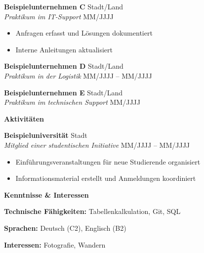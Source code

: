 \documentclass[11pt]{article}
\begin{document}
\vspace{12pt}
\textbf{Beispielunternehmen C} \hfill Stadt/Land \\
\textit{Praktikum im IT-Support} \hfill MM/JJJJ
\begin{itemize}[noitemsep, topsep=0pt, parsep=0pt]
    \item Anfragen erfasst und Lösungen dokumentiert
    \item Interne Anleitungen aktualisiert
\end{itemize}

\vspace{12pt}
\textbf{Beispielunternehmen D} \hfill Stadt/Land \\
\textit{Praktikum in der Logistik} \hfill MM/JJJJ -- MM/JJJJ

\vspace{12pt}
\textbf{Beispielunternehmen E} \hfill Stadt/Land \\
\textit{Praktikum im technischen Support} \hfill MM/JJJJ

\vspace{12pt}

\begin{center}
    \textbf{\Large Aktivitäten}
    \hrulefill
\end{center}

\textbf{Beispieluniversität} \hfill Stadt \\
\textit{Mitglied einer studentischen Initiative} \hfill MM/JJJJ -- MM/JJJJ
\begin{itemize}[noitemsep, topsep=0pt, parsep=0pt]
    \item Einführungsveranstaltungen für neue Studierende organisiert
    \item Informationsmaterial erstellt und Anmeldungen koordiniert
\end{itemize}

\vspace{12pt}

\begin{center}
    \textbf{\Large Kenntnisse \& Interessen}
    \hrulefill
\end{center}

\textbf{Technische Fähigkeiten:} Tabellenkalkulation, Git, SQL

\vspace{6pt}

\textbf{Sprachen:} Deutsch (C2), Englisch (B2)
\vspace{6pt}

\textbf{Interessen:} Fotografie, Wandern
\end{document}
